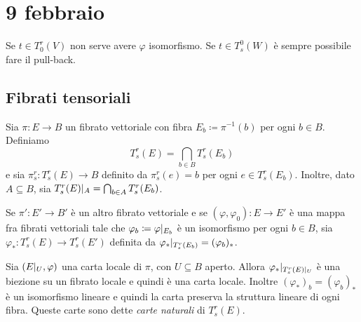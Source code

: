 \chapter{9 febbraio}

\begin{remark} %
Se $t\in T_0^r(V)$ non serve avere $\varphi$ isomorfismo.
Se $t\in T_s^0(W)$ è sempre possibile fare il pull-back.
\end{remark}

\section{Fibrati tensoriali}

\begin{definition}
	Sia $\pi:E\to B$ un fibrato vettoriale con fibra $E_b \coloneqq \pi^{-1}(b)$ per ogni $b\in B$. Definiamo
	\begin{equation*}
		T_s^r(E) = \bigcap_{b\in B} T_s^r(E_b)
	\end{equation*}
	e sia $\pi_s^r:T_s^r(E)\to B$ definito da $\pi_s^r(e) = b$ per ogni $e\in T_s^r(E_b)$.
	Inoltre, dato $A\subseteq B$, sia $T_s^r(E)|_ A = \bigcap_{b\in A} T_s^r(E_b)$.

	Se $\pi':E'\to B'$ è un altro fibrato vettoriale e se $(\varphi,\varphi_0):E\to E'$ è una mappa fra fibrati vettoriali tale che $\varphi_b \coloneqq \varphi|_{E_b}$ è un isomorfismo per ogni $b\in B$, sia $\varphi_*:T_s^r(E)\to T_s^r(E')$ definita da $\varphi_*|_{T_s^r(E_b)} = (\varphi_b)_*$.
\end{definition}

Sia $(E|_ U,\varphi)$ una carta locale di $\pi$, con $U\subseteq B$ aperto. Allora $\varphi_* |_{T_s^r(E)|_ U}$ è una biezione su un fibrato locale e quindi è una carta locale.
Inoltre $(\varphi_*)_b = (\varphi_b)_*$ è un isomorfismo lineare e quindi la carta preserva la struttura lineare di ogni fibra. Queste carte sono dette \emph{carte naturali} di $T_s^r(E)$.

